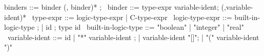 \begin{syntax}
  binders ::= binder (, binder)* ;
  \
  binder ::= type-expr variable-ident;
             (,variable-ident)*
  \
  type-expr ::= logic-type-expr | C-type-expr
  \
  logic-type-expr ::= built-in-logic-type ;
  | id ; type id
  \
  built-in-logic-type ::= "boolean" | "integer" | { "real" }
  \
  variable-ident ::= id
  | "*" variable-ident ;
  | variable-ident "[]";
  | "(" variable-ident ")"
\end{syntax}
